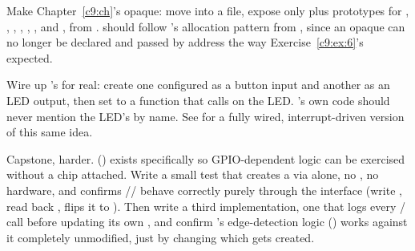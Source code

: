 \label{c10:ex:4}
Make Chapter~\ref{c9:ch}'s  opaque: move  into a
 file, expose only  plus prototypes for
, , , ,
, , and , from \mbox{}.
 should
follow 's allocation pattern from , since an opaque
 can no longer be declared and passed by address the way Exercise~\ref{c9:ex:6}'s
 expected.

\label{c10:ex:5}
Wire up 's  for real: create one  configured as a
button input and another as an LED output, then set  to a function that calls
 on the LED. 's own code should never mention the LED's
 by name. See  for a fully wired, interrupt-driven version of this
same idea.

\label{c10:ex:6}
Capstone, harder.  () exists specifically so GPIO-dependent
logic can be exercised without a chip attached. Write a small test that creates a
 via  alone, no , no
hardware, and confirms // behave correctly purely through
the interface (write , read back ,  flips it to
). Then write a third implementation, one that logs every /%
 call before updating its own , and confirm 's
edge-detection logic () works against it completely unmodified, just by changing
which  gets created.
